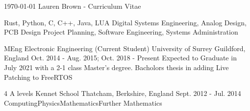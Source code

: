 \documentclass[11pt, a4paper]{awesome-cv}
\begin{document}
\makecvheader

\makecvfooter
  {\today}
  {Lauren Brown - Curriculum Vitae}
  {\thepage}


\begin{cvskills}
  {Rust, Python, C, C++, Java, LUA}
  {Digital Systems Engineering, Analog Design, PCB Design}
  {Project Planning, Software Engineering, Systems Administration}
\end{cvskills}

\begin{cventries}
  \cventry
    {MEng Electronic Engineering (Current Student)} %
    {University of Surrey} %
    {Guildford, England} %
    {Oct. 2014 - Aug. 2015; Oct. 2018 - Present} %
    {Expected to Graduate in July 2021 with a 2-1 class Master's degree. Bacholors thesis in adding Live Patching to FreeRTOS}
    
  \cventry
    {4 A levels} %
    {Kennet School} %
    {Thatcham, Berkshire, England} %
    {Sept. 2012 - Jul. 2014} %
    {
      Computing{\enskip\cdotp\enskip}Physics{\enskip\cdotp\enskip}Mathematics{\enskip\cdotp\enskip}Further Mathematics
    }
\end{cventries}
\end{document}
